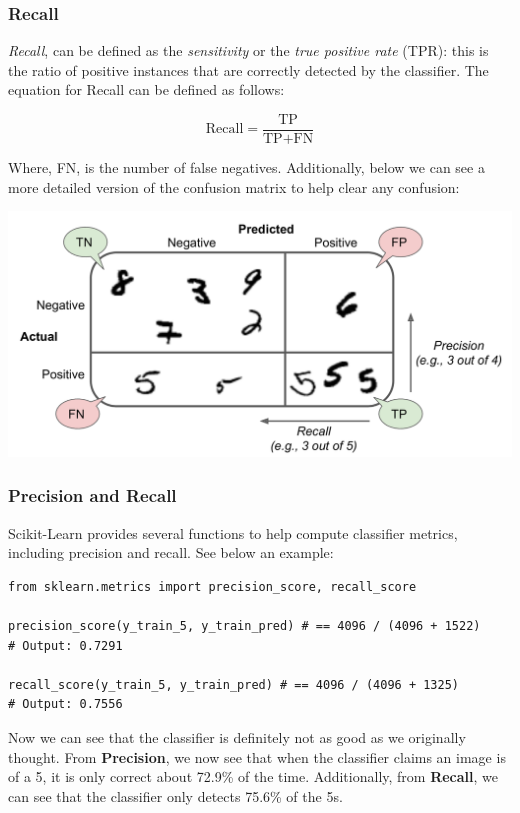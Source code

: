\subsubsection*{Recall}

\textit{Recall}, can be defined as the \textit{sensitivity} or the \textit{true positive rate} (TPR):
this is the ratio of positive instances that are correctly detected by the classifier. The 
equation for Recall can be defined as follows:

$$\text{Recall} = \frac{\text{TP}}{\text{TP} + \text{FN}}$$

\noindent
Where, FN, is the number of false negatives. Additionally, below we can see a more detailed 
version of the confusion matrix to help clear any confusion:

\includegraphics[scale=0.65]{Images/ConfusionMatrix.PNG}

\subsubsection*{Precision and Recall}

Scikit-Learn provides several functions to help compute classifier metrics, including precision
and recall. See below an example:

\pagebreak

\begin{verbatim}
from sklearn.metrics import precision_score, recall_score

precision_score(y_train_5, y_train_pred) # == 4096 / (4096 + 1522)
# Output: 0.7291

recall_score(y_train_5, y_train_pred) # == 4096 / (4096 + 1325)
# Output: 0.7556
\end{verbatim}

\noindent
Now we can see that the classifier is definitely not as good as we originally thought. From 
\textbf{Precision}, we now see that when the classifier claims an image is of a 5, it is only 
correct about 72.9\% of the time. Additionally, from \textbf{Recall}, we can see that the classifier 
only detects 75.6\% of the 5s. \\

